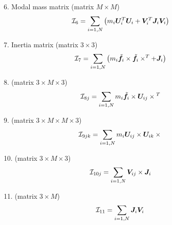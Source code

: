 \begin{enumerate}
\item[6.] Modal mass matrix
(matrix $M\times{M}$)
\begin{equation}
	\mathcal{I}_6 = \sum_{i=1,N} \left( 
		m_i \bm{U}_i^T \bm{U}_i
		+ \bm{V}_i^T \bm{J}_i \bm{V}_i
	 \right)
\end{equation}

\item[7.] Inertia matrix
(matrix $3\times{3}$)
\begin{equation}
	\mathcal{I}_7 = \sum_{i=1,N} \left( 
		m_i \tilde{\bm{f}}_i \times \tilde{\bm{f}}_i \times^T + \bm{J}_i
	 \right)
\end{equation}

\item[8.]
(matrix $3\times{M}\times{3}$)
\begin{equation}
	\mathcal{I}_{8j} =
		\sum_{i=1,N} m_i \tilde{\bm{f}}_{i} \times \bm{U}_{ij} \times{}^T
\end{equation}

\item[9.]
(matrix $3\times{M}\times{M}\times{3}$)
\begin{equation}
	\mathcal{I}_{9jk} = \sum_{i=1,N} m_i \bm{U}_{ij} \times \bm{U}_{ik} \times{}
\end{equation}

\item[10.]
(matrix $3\times{M}\times{3}$)
\begin{equation}
	\mathcal{I}_{10j} = \sum_{i=1,N} \bm{V}_{ij}\times \bm{J}_i
\end{equation}

\item[11.]
(matrix $3\times{M}$)
\begin{equation}
	\mathcal{I}_{11} = \sum_{i=1,N} \bm{J}_i \bm{V}_i
\end{equation}

\end{enumerate}

